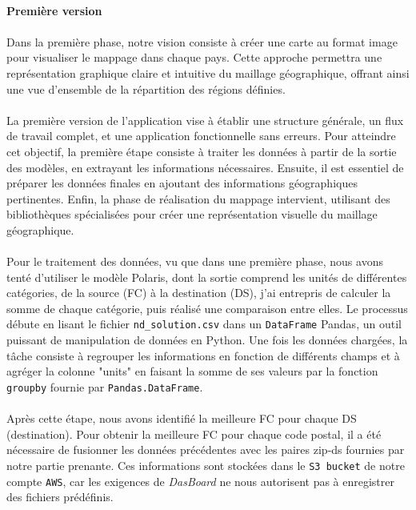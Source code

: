 \paragraph{}
\vspace{-2em}
{\large\textbf{{Première version}}}
\paragraph{}
\vspace{-2em}
Dans la première phase, notre vision consiste à créer une carte au format image pour visualiser le mappage dans chaque pays. Cette approche permettra une représentation graphique claire et intuitive du maillage géographique, offrant ainsi une vue d'ensemble de la répartition des régions définies.
\paragraph{}
\vspace{-2em}
La première version de l'application vise à établir une structure générale, un flux de travail complet, et une application fonctionnelle sans erreurs. Pour atteindre cet objectif, la première étape consiste à traiter les données à partir de la sortie des modèles, en extrayant les informations nécessaires. Ensuite, il est essentiel de préparer les données finales en ajoutant des informations géographiques pertinentes. Enfin, la phase de réalisation du mappage intervient, utilisant des bibliothèques spécialisées pour créer une représentation visuelle du maillage géographique. 

\paragraph{}
\vspace{-2em}
Pour le traitement des données, vu que dans une première phase, nous avons tenté d'utiliser le modèle Polaris, dont la sortie comprend les unités de différentes catégories, de la source (FC) à la destination (DS), j'ai entrepris de calculer la somme de chaque catégorie, puis réalisé une comparaison entre elles. Le processus débute en lisant le fichier \texttt{nd\_solution.csv} dans un \texttt{DataFrame} Pandas, un outil puissant de manipulation de données en Python. Une fois les données chargées, la tâche consiste à regrouper les informations en fonction de différents champs et à agréger la colonne "units" en faisant la somme de ses valeurs par la fonction \texttt{groupby} fournie par \texttt{Pandas.DataFrame}. 
\paragraph{}
\vspace{-2em}
Après cette étape, nous avons identifié la meilleure FC pour chaque DS (destination). Pour obtenir la meilleure FC pour chaque code postal, il a été nécessaire de fusionner les données précédentes avec les paires zip-ds fournies par notre partie prenante. Ces informations sont stockées dans le \texttt{S3 bucket} de notre compte \texttt{AWS}, car les exigences de \textit{DasBoard} ne nous autorisent pas à enregistrer des fichiers prédéfinis.

